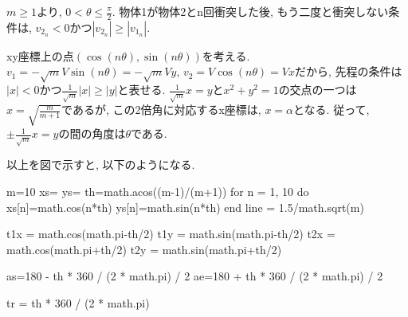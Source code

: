 \documentclass[lualatex,a5paper,ja=standard]{bxjsarticle}
\begin{document}
$m \ge 1$より, $0 < \theta \le \frac{\pi}{2}$. 物体1が物体2とn回衝突した後, もう二度と衝突しない条件は, $v_{2_n} < 0$かつ$|v_{2_n}| \ge |v_{1_n}|$.

xy座標上の点$(\cos(n\theta), \sin(n\theta))$を考える. $v_1 = -\sqrt{m}V\sin(n\theta) = -\sqrt{m}Vy$, $v_2 = V\cos(n\theta) = Vx$だから, 先程の条件は$|x|<0$かつ$\frac{1}{\sqrt{m}} |x| \ge |y|$と表せる.
$\frac{1}{\sqrt{m}} x = y$と$x^2 + y^2 = 1$の交点の一つは$x=\sqrt{\frac{m}{m+1}}$であるが, この2倍角に対応するx座標は, $x=\alpha$となる. 従って, $\pm\frac{1}{\sqrt{m}} x = y$の間の角度は$\theta$である.

以上を図で示すと, 以下のようになる.

\begin{luacode*}
    m=10
    xs={}
    ys={}
    th=math.acos((m-1)/(m+1))
    for n = 1, 10 do
        xs[n]=math.cos(n*th)
        ys[n]=math.sin(n*th)
    end
    line = 1.5/math.sqrt(m)

    t1x = math.cos(math.pi-th/2)
    t1y = math.sin(math.pi-th/2)
    t2x = math.cos(math.pi+th/2)
    t2y = math.sin(math.pi+th/2)

    as=180 - th * 360 / (2 * math.pi) / 2
    ae=180 + th * 360 / (2 * math.pi) / 2

    tr = th * 360 / (2 * math.pi)
\end{luacode*}
\end{document}
